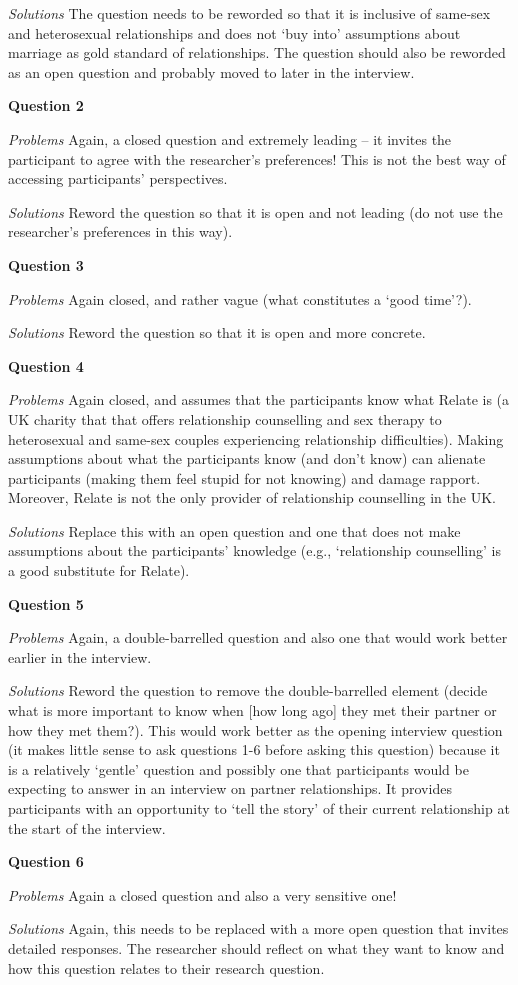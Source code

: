 \documentclass[
  english,
  letterpaper,
  DIV=11,
  numbers=noendperiod]{scrreprt}
\begin{document}
\begin{tcolorbox}
\emph{Solutions} The question needs to be reworded so that it is
inclusive of same-sex and heterosexual relationships and does not `buy
into' assumptions about marriage as gold standard of relationships. The
question should also be reworded as an open question and probably moved
to later in the interview.

\textbf{Question 2}

\emph{Problems} Again, a closed question and extremely leading -- it
invites the participant to agree with the researcher's preferences! This
is not the best way of accessing participants' perspectives.

\emph{Solutions} Reword the question so that it is open and not leading
(do not use the researcher's preferences in this way).

\textbf{Question 3}

\emph{Problems} Again closed, and rather vague (what constitutes a `good
time'?).

\emph{Solutions} Reword the question so that it is open and more
concrete.

\textbf{Question 4}

\emph{Problems} Again closed, and assumes that the participants know
what Relate is (a UK charity that that offers relationship counselling
and sex therapy to heterosexual and same-sex couples experiencing
relationship difficulties). Making assumptions about what the
participants know (and don't know) can alienate participants (making
them feel stupid for not knowing) and damage rapport. Moreover, Relate
is not the only provider of relationship counselling in the UK.

\emph{Solutions} Replace this with an open question and one that does
not make assumptions about the participants' knowledge (e.g.,
`relationship counselling' is a good substitute for Relate).

\textbf{Question 5}

\emph{Problems} Again, a double-barrelled question and also one that
would work better earlier in the interview.

\emph{Solutions} Reword the question to remove the double-barrelled
element (decide what is more important to know when {[}how long ago{]}
they met their partner or how they met them?). This would work better as
the opening interview question (it makes little sense to ask questions
1-6 before asking this question) because it is a relatively `gentle'
question and possibly one that participants would be expecting to answer
in an interview on partner relationships. It provides participants with
an opportunity to `tell the story' of their current relationship at the
start of the interview.

\textbf{Question 6}

\emph{Problems} Again a closed question and also a very sensitive one!

\emph{Solutions} Again, this needs to be replaced with a more open
question that invites detailed responses. The researcher should reflect
on what they want to know and how this question relates to their
research question.

\end{tcolorbox}
\end{document}
